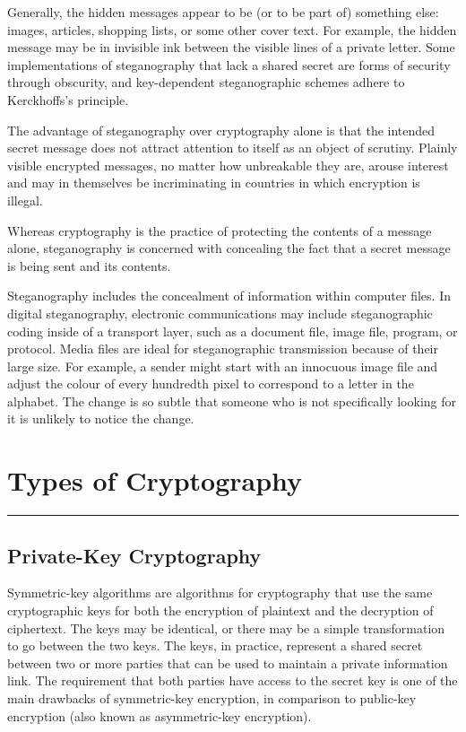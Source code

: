 \documentclass[british]{article}
\begin{document}
Generally, the hidden messages appear to be (or to be part of) something
else: images, articles, shopping lists, or some other cover text.
For example, the hidden message may be in invisible ink between the
visible lines of a private letter. Some implementations of steganography
that lack a shared secret are forms of security through obscurity,
and key-dependent steganographic schemes adhere to Kerckhoffs's principle.

The advantage of steganography over cryptography alone is that the
intended secret message does not attract attention to itself as an
object of scrutiny. Plainly visible encrypted messages, no matter
how unbreakable they are, arouse interest and may in themselves be
incriminating in countries in which encryption is illegal.

Whereas cryptography is the practice of protecting the contents of
a message alone, steganography is concerned with concealing the fact
that a secret message is being sent and its contents.

Steganography includes the concealment of information within computer
files. In digital steganography, electronic communications may include
steganographic coding inside of a transport layer, such as a document
file, image file, program, or protocol. Media files are ideal for
steganographic transmission because of their large size. For example,
a sender might start with an innocuous image file and adjust the colour
of every hundredth pixel to correspond to a letter in the alphabet.
The change is so subtle that someone who is not specifically looking
for it is unlikely to notice the change.

\vfill{}

\pagebreak{}

\section{Types of Cryptography}
\begin{center}
\rule[0.5ex]{450bp}{0.75pt}
\par\end{center}

\subsection{Private-Key Cryptography}

Symmetric-key algorithms are algorithms for cryptography that use
the same cryptographic keys for both the encryption of plaintext and
the decryption of ciphertext. The keys may be identical, or there
may be a simple transformation to go between the two keys. The keys,
in practice, represent a shared secret between two or more parties
that can be used to maintain a private information link. The requirement
that both parties have access to the secret key is one of the main
drawbacks of symmetric-key encryption, in comparison to public-key
encryption (also known as asymmetric-key encryption). 
\end{document}
